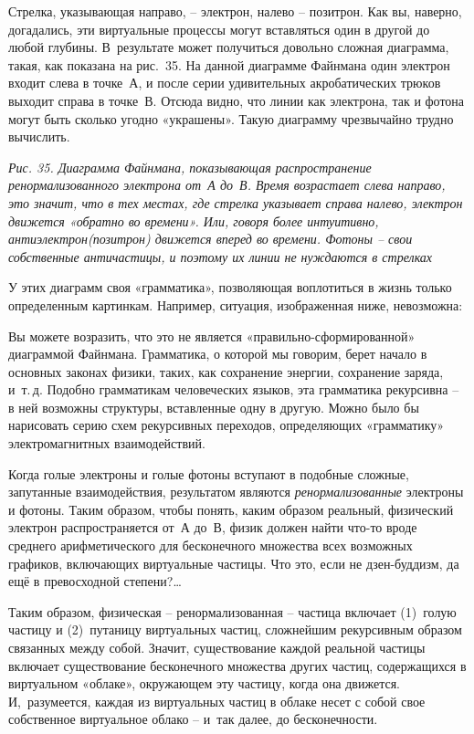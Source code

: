 \documentclass[../main.tex]{subfiles}
\begin{document}
Стрелка, указывающая направо, \--- электрон, налево \--- позитрон. Как вы, наверно, догадались, эти виртуальные процессы могут вставляться один в другой до любой глубины. В~результате может получиться довольно сложная диаграмма, такая, как показана на рис.~35. На данной диаграмме Файнмана один электрон входит слева в точке~А, и после серии удивительных акробатических трюков выходит справа в точке~В\@. Отсюда видно, что линии как электрона, так и фотона могут быть сколько угодно «украшены». Такую диаграмму чрезвычайно трудно вычислить.

\emph{Рис. 35. Диаграмма Файнмана, показывающая распространение ренормализованного электрона от~А до~В\@. Время возрастает слева направо, это значит, что в тех местах, где стрелка указывает справа налево, электрон движется «обратно во времени». Или, говоря более интуитивно, антиэлектрон(позитрон) движется вперед во времени. Фотоны \--- свои собственные античастицы, и поэтому их линии не нуждаются в стрелках}

У этих диаграмм своя «грамматика», позволяющая воплотиться в жизнь только определенным картинкам. Например, ситуация, изображенная ниже, невозможна:

Вы можете возразить, что это не является «правильно-сформированной» диаграммой Файнмана. Грамматика, о которой мы говорим, берет начало в основных законах физики, таких, как сохранение энергии, сохранение заряда, и~т.\,д. Подобно грамматикам человеческих языков, эта грамматика рекурсивна \--- в ней возможны структуры, вставленные одну в другую. Можно было бы нарисовать серию схем рекурсивных переходов, определяющих «грамматику» электромагнитных взаимодействий.

Когда голые электроны и голые фотоны вступают в подобные сложные, запутанные взаимодействия, результатом являются \emph{ренормализованные} электроны и фотоны. Таким образом, чтобы понять, каким образом реальный, физический электрон распространяется от~А до~В, физик должен найти что-то вроде среднего арифметического для бесконечного множества всех возможных графиков, включающих виртуальные частицы. Что это, если не дзен-буддизм, да ещё в превосходной степени?\ldots{}

Таким образом, физическая \--- ренормализованная \--- частица включает (1)~голую частицу и (2)~путаницу виртуальных частиц, сложнейшим рекурсивным образом связанных между собой. Значит, существование каждой реальной частицы включает существование бесконечного множества других частиц, содержащихся в виртуальном «облаке», окружающем эту частицу, когда она движется. И,~разумеется, каждая из виртуальных частиц в облаке несет с собой свое собственное виртуальное облако \--- и~так далее, до бесконечности.
\end{document}
